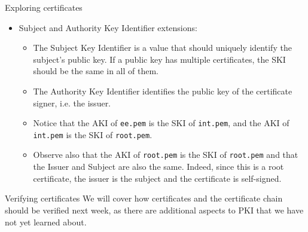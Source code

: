 \documentclass{practice}
\begin{document}
\begin{task}{Exploring certificates}
\begin{itemize}
\begin{itemize}
      More specifically, the following is crucial:
      \begin{itemize}
        \item When verifying an issuer's signature on an entity's certificate, the issuer's public key must have the \texttt{Certificate Sign} capability.

        A CA must have it; an end-entity must not.
        \item When verifying a signature on a CRL (next week's topic), the signer's public key must have the \texttt{CRL Sign} capability.
        \item When verifying any other signature, the signer's public key must have the \texttt{Digital Signature} or/and \texttt{Non Repudiation} capability.
        Neither of those capabilities encompasses the certificate and CRL signing capabilities.

        The difference between the DS and NR capabilities is not clear-cut.
        We will talk about this later.
      \end{itemize}
      Note that these conditions are standardised conventions/policies, and are not cryptographic in nature.
      In the real world, if these conditions are not satisfied, you must not accept the signature, even if it is cryptographically correct.
    \end{itemize}

    \item Subject and Authority Key Identifier extensions:
    \begin{itemize}
      \item The Subject Key Identifier is a value that should uniquely identify\footnotemark{} the subject's public key.
      If a public key has multiple certificates, the SKI should be the same in all of them.
      \item The Authority Key Identifier identifies the public key of the certificate signer, i.e. the issuer.
      \item Notice that the AKI of \texttt{ee.pem} is the SKI of \texttt{int.pem}, and the AKI of \texttt{int.pem} is the SKI of \texttt{root.pem}.
      \item Observe also that the AKI of \texttt{root.pem} is the SKI of \texttt{root.pem} and that the Issuer and Subject are also the same.
      Indeed, since this is a root certificate, the issuer is the subject and the certificate is self-signed.
    \end{itemize}
  \end{itemize}
\end{task}

\begin{task}{Verifying certificates}
  We will cover how certificates and the certificate chain should be verified next week, as there are additional aspects to PKI that we have not yet learned about.
\end{task}
\end{document}
